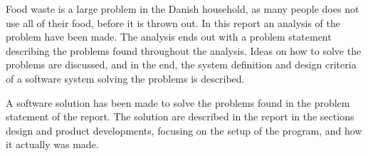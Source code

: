 Food waste is a large problem in the Danish household, as many people does not use all of their food, before it is thrown out. In this report an analysis of the problem have been made. The analysis ends out with a problem statement describing the problems found throughout the analysis. Ideas on how to solve the problems are discussed, and in the end, the system definition and design criteria of a software system solving the problems is described.

A software solution has been made to solve the  problems found in the problem statement of the report. The solution are described in the report in the sections design and product developments, focusing on the setup of the program, and how it actually was made.